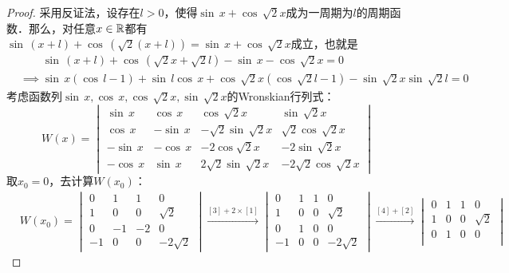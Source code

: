\begin{proof}
采用反证法，设存在$l > 0$，使得$\sin \, x + \cos \, \sqrt{2} x$成为一周期为$l$的周期函数．那么，对任意$x \in \mathbb{R}$都有$\sin \, (x + l) + \cos \, (\sqrt{2}(x+l)) = \sin \, x + \cos \, \sqrt{2}x$成立，也就是
\begin{align}
    &\mathrel{\phantom{\implies}} \sin \, (x+l) + \cos \, (\sqrt{2}x + \sqrt{2}l) - \sin \, x - \cos \, \sqrt{2} x  = 0 \\
    &\implies \sin \, x (\cos \, l - 1) + \sin \, l \cos \, x + \cos \, \sqrt{2} x ( \cos \, \sqrt{2} l - 1) - \sin \, \sqrt{2} x \sin \, \sqrt{2} l = 0 \label{eq:irrelavant}
\end{align}
考虑函数列$\sin \, x, \cos \, x, \cos \, \sqrt{2}x , \sin \, \sqrt{2} x$的Wronskian行列式：
\begin{equation}
    W(x) = \begin{vmatrix}
        \sin \, x & \cos \, x & \cos \, \sqrt{2} x & \sin \, \sqrt{2} x \\
        \cos \, x & -\sin \, x & -\sqrt{2} \sin \, \sqrt{2} x & \sqrt{2} \cos \, \sqrt{2} x \\
        -\sin \, x & -\cos \, x & -2 \cos \sqrt{2} x & -2 \sin \, \sqrt{2} x \\
        -\cos \, x & \sin \, x & 2\sqrt{2} \sin \, \sqrt{2} x & -2\sqrt{2} \cos \, \sqrt{2} x 
    \end{vmatrix}
\end{equation}
取$x_0 = 0$，去计算$W(x_0)$：
\begin{align}
    &W(x_0) = \begin{vmatrix}
        0 & 1 & 1 & 0  \\
        1 & 0 & 0 & \sqrt{2} \\
        0 & -1 & -2 & 0 \\
        -1 & 0 & 0 & -2\sqrt{2}
    \end{vmatrix} \xrightarrow{[3] + 2 \times [1]} \begin{vmatrix}
        0 & 1 & 1 & 0 \\
        1 & 0 & 0 & \sqrt{2} \\
        0 & 1 & 0 & 0 \\
        -1 & 0 & 0 & -2\sqrt{2}
    \end{vmatrix} \xrightarrow{[4]+[2]} \begin{vmatrix}
            0 & 1 & 1 & 0 \\
            1 & 0 & 0 & \sqrt{2} \\
            0 & 1 & 0 & 0 \\

\end{vmatrix}
\end{align}
\end{proof}
